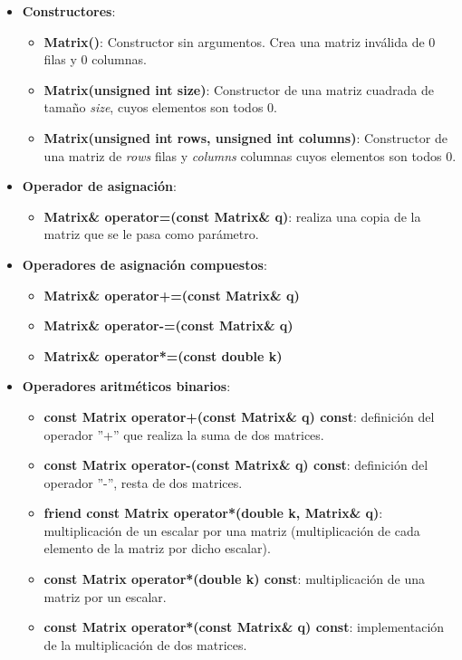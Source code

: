 \documentclass[12pt, a4paper]{report}
\begin{document}
\begin{itemize}

\item \textbf{Constructores}:

\begin{itemize}
\item \textbf{Matrix()}: Constructor sin argumentos. Crea una matriz inválida de 0 filas y 0 columnas.

\item \textbf{Matrix(unsigned int size)}: Constructor de una matriz cuadrada de tamaño \textit{size}, cuyos elementos son todos 0.

\item \textbf{Matrix(unsigned int rows, unsigned int columns)}: Constructor de una matriz de \textit{rows} filas y \textit{columns} columnas cuyos elementos son todos 0.
\end{itemize}

\item \textbf{Operador de asignación}:

\begin{itemize}
\item \textbf{Matrix\& operator=(const Matrix\& q)}: realiza una copia de la matriz que se le pasa como parámetro.
\end{itemize} 

\item \textbf{Operadores de asignación compuestos}:

\begin{itemize}
\item \textbf{Matrix\& operator+=(const Matrix\& q)}
\item \textbf{Matrix\& operator-=(const Matrix\& q)}
\item \textbf{Matrix\& operator*=(const double k)}
\end{itemize}

\item \textbf{Operadores aritméticos binarios}:

\begin{itemize}
\item \textbf{const Matrix operator+(const Matrix\& q) const}: definición del operador ''+'' que realiza la suma de dos matrices.
\item \textbf{const Matrix operator-(const Matrix\& q) const}: definición del operador ''-'', resta de dos matrices.
\item \textbf{friend const Matrix operator*(double k, Matrix\& q)}: multiplicación de un escalar por una matriz (multiplicación de cada elemento de la matriz por dicho escalar).
\item \textbf{const Matrix operator*(double k) const}: multiplicación de una matriz por un escalar.
\item \textbf{const Matrix operator*(const Matrix\& q) const}: implementación de la multiplicación de dos matrices.
\end{itemize}


\end{itemize}
\end{document}
